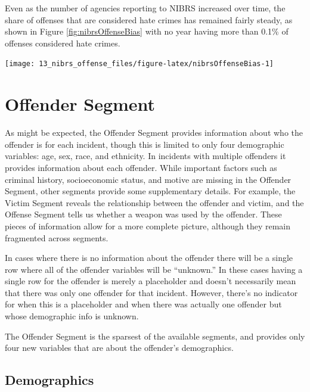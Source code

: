 \documentclass[
]{krantz}
\let\origfigure\figure
\let\endorigfigure\endfigure
\renewenvironment{figure}[1][2] {
    \expandafter\origfigure\expandafter[H]
} {
    \endorigfigure
}
\begin{document}
Even as the number of agencies reporting to NIBRS increased
over time, the share of offenses that are considered hate
crimes has remained fairly steady, as shown in Figure
\ref{fig:nibrsOffenseBias} with no year having more than
0.1\% of offenses considered hate crimes.

\begin{figure}

{\centering \texttt{[image: 13\_nibrs\_offense\_files/figure-latex/nibrsOffenseBias-1]} 

}

\caption{The annual percent of offenses reported as having a bias motivation (i.e. hate crime), 1993-2022.}\label{fig:nibrsOffenseBias}
\end{figure}

\chapter{Offender Segment}\label{offender-segment-1}

As might be expected, the Offender Segment provides
information about who the offender is for each incident,
though this is limited to only four demographic variables:
age, sex, race, and ethnicity. In incidents with multiple
offenders it provides information about each offender. While
important factors such as criminal history, socioeconomic
status, and motive are missing in the Offender Segment,
other segments provide some supplementary details. For
example, the Victim Segment reveals the relationship between
the offender and victim, and the Offense Segment tells us
whether a weapon was used by the offender. These pieces of
information allow for a more complete picture, although they
remain fragmented across segments.

In cases where there is no information about the offender
there will be a single row where all of the offender
variables will be ``unknown.'' In these cases having a
single row for the offender is merely a placeholder and
doesn't necessarily mean that there was only one offender
for that incident. However, there's no indicator for when
this is a placeholder and when there was actually one
offender but whose demographic info is unknown.

The Offender Segment is the sparsest of the available
segments, and provides only four new variables that are
about the offender's demographics.

\section{Demographics}\label{demographics-1}
\end{document}
